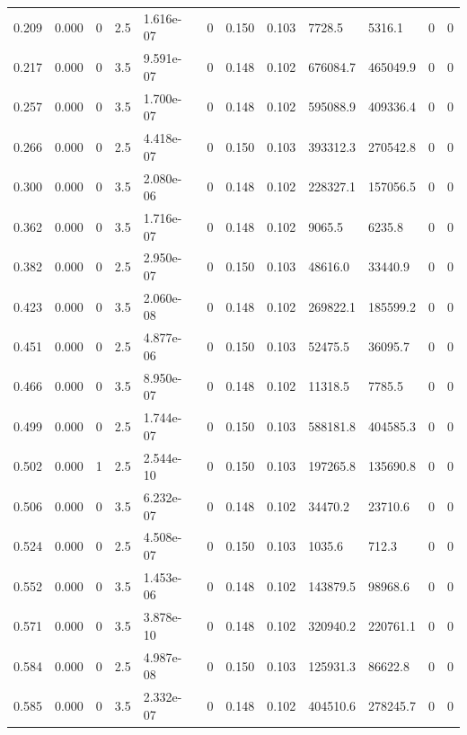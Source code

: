 \documentclass[preview]{standalone}
\begin{document}
{{\begin{tabular}{L{1.2cm}C{1.2cm} C{0.3cm}C{0.5cm} C{1.4cm}C{1.4cm} C{1.4cm}C{1.4cm} C{1.6cm}C{1.6cm} C{1.6cm}C{1.6cm}}
  0.209  &  0.000  & 0     & 2.5 &  1.616e-07  & 0  &  0.150&   0.103& 7728.5 & 5316.1   &  0 & 0  \\ 
  0.217  &  0.000  & 0     & 3.5 &  9.591e-07  & 0  &  0.148&   0.102& 676084.7 & 465049.9   &  0 & 0  \\ 
  0.257  &  0.000  & 0     & 3.5 &  1.700e-07  & 0  &  0.148&   0.102& 595088.9 & 409336.4   &  0 & 0  \\ 
  0.266  &  0.000  & 0     & 2.5 &  4.418e-07  & 0  &  0.150&   0.103& 393312.3 & 270542.8   &  0 & 0  \\ 
  0.300  &  0.000  & 0     & 3.5 &  2.080e-06  & 0  &  0.148&   0.102& 228327.1 & 157056.5   &  0 & 0  \\ 
  0.362  &  0.000  & 0     & 3.5 &  1.716e-07  & 0  &  0.148&   0.102& 9065.5 & 6235.8   &  0 & 0  \\ 
  0.382  &  0.000  & 0     & 2.5 &  2.950e-07  & 0  &  0.150&   0.103& 48616.0 & 33440.9   &  0 & 0  \\ 
  0.423  &  0.000  & 0     & 3.5 &  2.060e-08  & 0  &  0.148&   0.102& 269822.1 & 185599.2   &  0 & 0  \\ 
  0.451  &  0.000  & 0     & 2.5 &  4.877e-06  & 0  &  0.150&   0.103& 52475.5 & 36095.7   &  0 & 0  \\ 
  0.466  &  0.000  & 0     & 3.5 &  8.950e-07  & 0  &  0.148&   0.102& 11318.5 & 7785.5   &  0 & 0  \\ 
  0.499  &  0.000  & 0     & 2.5 &  1.744e-07  & 0  &  0.150&   0.103& 588181.8 & 404585.3   &  0 & 0  \\ 
  0.502  &  0.000  & 1     & 2.5 &  2.544e-10  & 0  &  0.150&   0.103& 197265.8 & 135690.8   &  0 & 0  \\ 
  0.506  &  0.000  & 0     & 3.5 &  6.232e-07  & 0  &  0.148&   0.102& 34470.2 & 23710.6   &  0 & 0  \\ 
  0.524  &  0.000  & 0     & 2.5 &  4.508e-07  & 0  &  0.150&   0.103& 1035.6 & 712.3   &  0 & 0  \\ 
  0.552  &  0.000  & 0     & 3.5 &  1.453e-06  & 0  &  0.148&   0.102& 143879.5 & 98968.6   &  0 & 0  \\ 
  0.571  &  0.000  & 0     & 3.5 &  3.878e-10  & 0  &  0.148&   0.102& 320940.2 & 220761.1   &  0 & 0  \\ 
  0.584  &  0.000  & 0     & 2.5 &  4.987e-08  & 0  &  0.150&   0.103& 125931.3 & 86622.8   &  0 & 0  \\ 
  0.585  &  0.000  & 0     & 3.5 &  2.332e-07  & 0  &  0.148&   0.102& 404510.6 & 278245.7   &  0 & 0  \\ 

\end{tabular}}}
\end{document}
